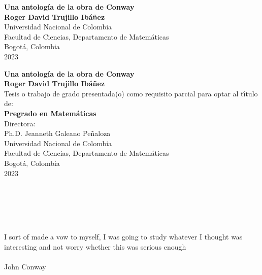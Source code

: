 \begin{center}
\begin{figure}
\centering%
%
\end{figure}
\thispagestyle{empty} \vspace*{2.0cm} \textbf{\huge
Una antolog\'ia de la obra de Conway}\\[6.0cm]
\Large\textbf{Roger David Trujillo Ibáñez}\\[6.0cm]
\small Universidad Nacional de Colombia\\
Facultad de Ciencias, Departamento de Matemáticas\\
Bogotá, Colombia\\
2023\\
\end{center}

\newpage{\pagestyle{empty}\cleardoublepage}

\newpage
\begin{center}
\thispagestyle{empty} \vspace*{0cm} \textbf{\huge
Una antolog\'ia de la obra de Conway}\\[3.0cm]
\Large\textbf{Roger David Trujillo Ibáñez}\\[3.0cm]
\small Tesis o trabajo de grado presentada(o) como requisito parcial para optar al
t\'{\i}tulo de:\\
\textbf{Pregrado en Matemáticas}\\[2.5cm]
Directora:\\
Ph.D. Jeanneth Galeano Pe\~naloza\\[5.0cm]
Universidad Nacional de Colombia\\
Facultad de Ciencias, Departamento de Matemáticas\\
Bogot\'a, Colombia\\
2023\\
\end{center}

\newpage{\pagestyle{empty}\cleardoublepage}

\newpage
\thispagestyle{empty} \textbf{}\normalsize
\\\\\\%
\\[4.0cm]

\begin{flushright}
\begin{minipage}{8cm}
    \noindent
        \small
        I sort of made a vow to myself, I was going to study whatever I thought was interesting and not worry whether this was serious enough\\\\
        John Conway\\
\end{minipage}
\end{flushright}

